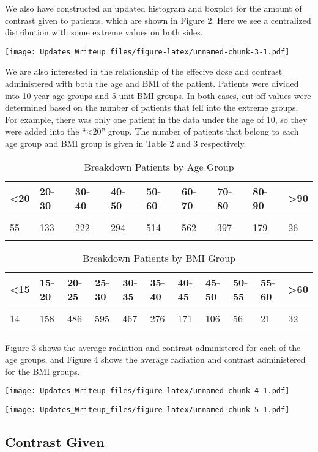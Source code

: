 \documentclass[]{article}
\begin{document}
We also have constructed an updated histogram and boxplot for the amount
of contrast given to patients, which are shown in Figure 2. Here we see
a centralized distribution with some extreme values on both sides.

\texttt{[image: Updates\_Writeup\_files/figure-latex/unnamed-chunk-3-1.pdf]}

We are also interested in the relationship of the effecive dose and
contrast administered with both the age and BMI of the patient. Patients
were divided into 10-year age groups and 5-unit BMI groups. In both
cases, cut-off values were determined based on the number of patients
that fell into the extreme groups. For example, there was only one
patient in the data under the age of 10, so they were added into the
``\textless{}20'' group. The number of patients that belong to each age
group and BMI group is given in Table 2 and 3 respectively.

\begin{table}[H] \centering 
  \caption{Breakdown Patients by Age Group} 
\begin{tabular}{p{1cm}p{1cm}p{1cm}p{1cm}p{1cm}p{1cm}p{1cm}p{1cm}p{1cm}}
\\[-1.8ex] \hline 
\hline
 <20 & 20-30 & 30-40 & 40-50& 50-60 & 60-70 & 70-80 & 80-90 & >90 \\ 
 \hline \\[-1.8ex] 
55 & 133 & 222 & 294 & 514 & 562 & 397 & 179 & 26 \\
\hline 
\hline \\[-1.8ex]
 \end{tabular}
\end{table}

\begin{table}[H] \centering 
  \caption{Breakdown Patients by BMI Group} 
\begin{tabular}{p{1cm}p{1cm}p{1cm}p{1cm}p{1cm}p{1cm}p{1cm}p{1cm}p{1cm}p{1cm}p{1cm}}
\\[-1.8ex] \hline 
\hline
 <15 & 15-20 & 20-25 & 25-30 & 30-35 & 35-40 & 40-45 & 45-50 & 50-55 & 55-60 & >60 \\ 
 \hline \\[-1.8ex] 
14 & 158 & 486 & 595 & 467 & 276 & 171 & 106 & 56 & 21 & 32 \\
\hline 
\hline \\[-1.8ex]
 \end{tabular}
\end{table}

Figure 3 shows the average radiation and contrast administered for each
of the age groups, and Figure 4 shows the average radiation and contrast
administered for the BMI groups.

\texttt{[image: Updates\_Writeup\_files/figure-latex/unnamed-chunk-4-1.pdf]}

\texttt{[image: Updates\_Writeup\_files/figure-latex/unnamed-chunk-5-1.pdf]}

\subsection{Contrast Given}\label{contrast-given}
\end{document}
